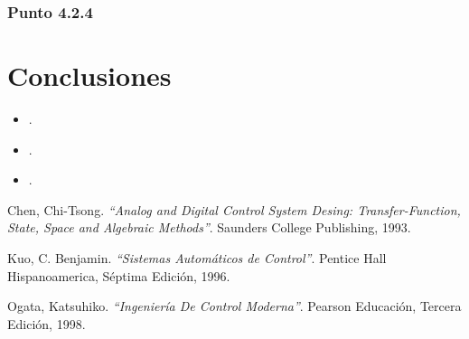 \documentclass[twocolumn]{IEEEtran}
\begin{document}
\subsubsection{Punto 4.2.4}
\noindent

\section{Conclusiones}
\begin{itemize}
 \item .
 \item .
 \item .
\end{itemize}


\begin{thebibliography}{99}

 Chen, Chi-Tsong.
{\em "`Analog and Digital Control System Desing: Transfer-Function, State, Space and Algebraic Methods"'}.
Saunders College Publishing, 1993.

 Kuo, C. Benjamin.
{\em "`Sistemas Automáticos de Control"'}.
Pentice Hall Hispanoamerica, Séptima Edición, 1996.

 Ogata, Katsuhiko.
{\em "`Ingeniería De Control Moderna"'}.
Pearson Educación, Tercera Edición, 1998.

\end{thebibliography}
\end{document}
